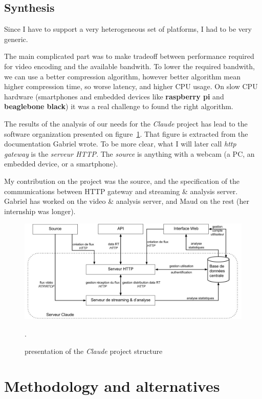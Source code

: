 \documentclass[a4paper,11pt]{custom}
\newcommand{\rpi}{\textbf{raspberry pi}\xspace}
\newcommand{\bbb}{\textbf{beaglebone black}\xspace}
\newcommand{\claude}{\textit{Claude}\xspace}
\begin{document}
\section{Synthesis}

Since I have to support a very heterogeneous set of platforms, I had to be very
generic.

The main complicated part was to make tradeoff between performance required for
video encoding and the available bandwith. To lower the required bandwith, we
can use a better compression algorithm, however better algorithm mean higher
compression time, so worse latency, and higher CPU usage. On slow CPU hardware
(smartphones and embedded devices like \rpi{} and \bbb{}) it was a real
challenge to found the right algorithm.

The results of the analysis of our needs for the \claude{} project has lead to
the software organization presented on figure~\ref{fig:architecture}. That figure
is extracted from the documentation Gabriel wrote. To be more clear, what I
will later call \textit{http gateway} is the \textit{serveur HTTP}. The \textit{source} is anything
with a webcam (a PC, an embedded device, or a smartphone).

My contribution on the project was the source, and the specification of the
communications between HTTP gateway and streaming \& analysis server. Gabriel
has worked on the video \& analysis server, and Maud on the rest (her internship
was longer).

\begin{figure}
  \centering
  \includegraphics[width=\textwidth]{architecture.jpg}
  \label{fig:architecture}
  \caption{presentation of the \claude{} project structure}.
\end{figure}

\chapter{Methodology and alternatives}
\label{sec:methodology}
\end{document}
